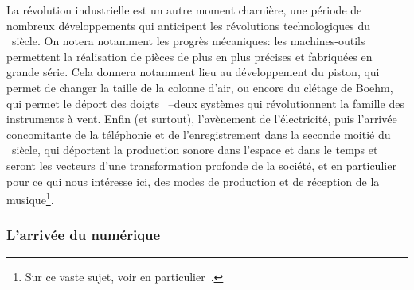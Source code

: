 \indent La révolution industrielle est un autre moment charnière, une période de nombreux développements qui anticipent les révolutions technologiques du ~siècle. On notera notamment les progrès mécaniques: les machines-outils permettent la réalisation de pièces de plus en plus précises et fabriquées en grande série. Cela donnera notamment lieu au développement du piston, qui permet de changer la taille de la colonne d'air, ou encore du clétage de Boehm, qui permet le déport des doigts ~--deux systèmes qui révolutionnent la famille des instruments à vent. Enfin (et surtout), l'avènement de l'électricité, puis l'arrivée concomitante de la téléphonie et de l'enregistrement dans la seconde moitié du ~siècle, qui déportent la production sonore dans l'espace et dans le temps et seront les vecteurs d'une transformation profonde de la société, et en particulier pour ce qui nous intéresse ici, des modes de production et de réception de la musique\footnote{Sur ce vaste sujet, voir en particulier~\cite{theberge_any_1997}.}.

%

\subsubsection{L'arrivée du numérique}


